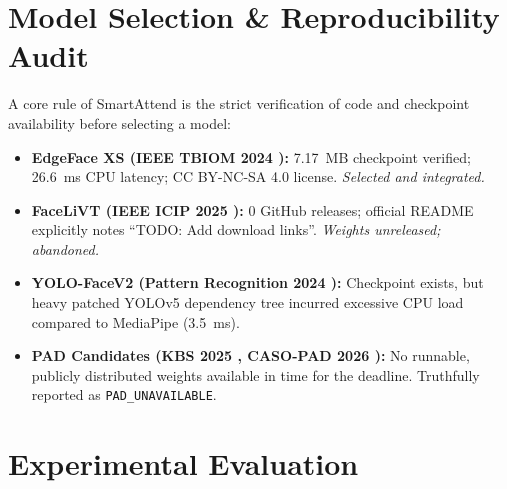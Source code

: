 \documentclass[conference]{IEEEtran}
\begin{document}
\section{Model Selection \& Reproducibility Audit}
\label{sec:audit}
A core rule of SmartAttend is the strict verification of code and checkpoint availability before selecting a model:
\begin{itemize}
    \item \textbf{EdgeFace XS (IEEE TBIOM 2024 \cite{george2024edgeface}):} 7.17~MB checkpoint verified; 26.6~ms CPU latency; CC BY-NC-SA 4.0 license. \textit{Selected and integrated.}
    \item \textbf{FaceLiVT (IEEE ICIP 2025 \cite{setyawan2025facelivt}):} 0 GitHub releases; official README explicitly notes ``TODO: Add download links''. \textit{Weights unreleased; abandoned.}
    \item \textbf{YOLO-FaceV2 (Pattern Recognition 2024 \cite{yu2024yolofacev2}):} Checkpoint exists, but heavy patched YOLOv5 dependency tree incurred excessive CPU load compared to MediaPipe (3.5~ms).
    \item \textbf{PAD Candidates (KBS 2025 \cite{khan2025spatiotemporal}, CASO-PAD 2026 \cite{khan2026casopad}):} No runnable, publicly distributed weights available in time for the deadline. Truthfully reported as \texttt{PAD\_UNAVAILABLE}.
\end{itemize}

\section{Experimental Evaluation}
\end{document}
